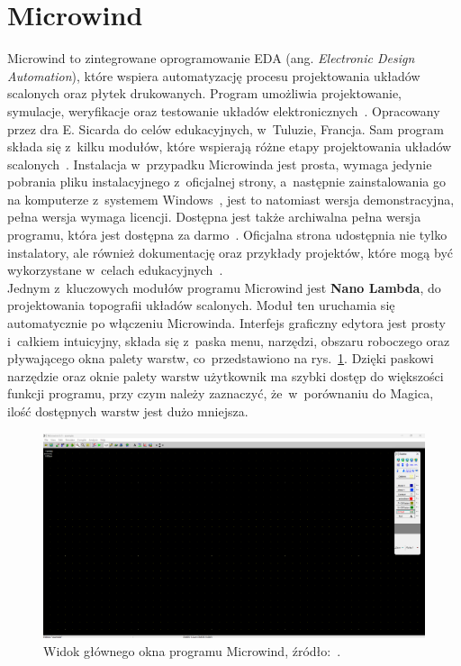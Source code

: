 \section{Microwind}

Microwind to zintegrowane oprogramowanie EDA (ang. \textit{Electronic Design Automation}),
które wspiera automatyzację procesu projektowania układów scalonych oraz płytek drukowanych.
Program umożliwia projektowanie, symulacje, weryfikacje oraz testowanie układów elektronicznych~\cite{eda}.
Opracowany przez dra E. Sicarda do celów edukacyjnych,
w~Tuluzie, Francja.
Sam program składa się z~kilku modułów,
które wspierają różne etapy projektowania układów scalonych~\cite{Microwind}.
Instalacja w~przypadku Microwinda jest prosta, wymaga jedynie pobrania pliku instalacyjnego z~oficjalnej strony,
a~następnie zainstalowania go na komputerze z~systemem Windows~\cite{Microwind},
jest to natomiast wersja demonstracyjna, pełna wersja wymaga licencji.
Dostępna jest także archiwalna pełna wersja programu, która jest dostępna za darmo~\cite{old_microwind}.
Oficjalna strona udostępnia nie tylko instalatory, ale również dokumentację oraz przykłady projektów,
które mogą być wykorzystane w~celach edukacyjnych~\cite{Microwind}.\\
\indent Jednym z~kluczowych modułów programu Microwind jest \textbf{Nano Lambda},
do projektowania topografii układów scalonych.
Moduł ten uruchamia się automatycznie po włączeniu Microwinda.
Interfejs graficzny edytora jest prosty i~całkiem intuicyjny,
składa się z~paska menu, narzędzi, obszaru roboczego oraz pływającego okna palety warstw,
co~przedstawiono na rys.~\ref{fig:microwind_okno}.
Dzięki paskowi narzędzie oraz oknie palety warstw użytkownik ma szybki dostęp do większości funkcji programu,
przy czym należy zaznaczyć, że~w~porównaniu do Magica, ilość dostępnych warstw jest dużo mniejsza.

\begin{figure}[h]
    \centering
    \includegraphics[width=.9\textwidth]{chapters/chapter2/img/microwind_okno}
    \caption[Widok głównego okna programu Microwind.]{Widok głównego okna programu Microwind, źródło:~\cite{Microwind}.}
    \label{fig:microwind_okno}
\end{figure}

